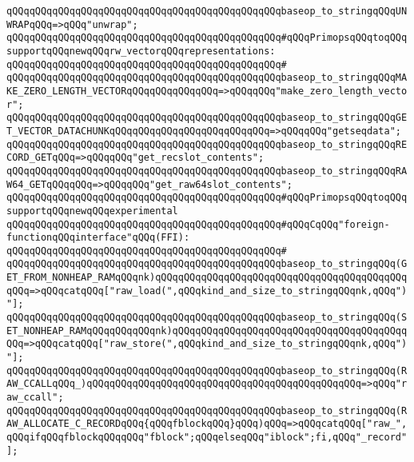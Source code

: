 \verb|qQQqqQQqqQQqqQQqqQQqqQQqqQQqqQQqqQQqqQQqqQQqqQQqbaseop_to_stringqQQqUNWRAPqQQq=>qQQq"unwrap";|\newline
\newline
\verb|qQQqqQQqqQQqqQQqqQQqqQQqqQQqqQQqqQQqqQQqqQQqqQQq#qQQqPrimopsqQQqtoqQQqsupportqQQqnewqQQqrw_vectorqQQqrepresentations:|\newline
\verb|qQQqqQQqqQQqqQQqqQQqqQQqqQQqqQQqqQQqqQQqqQQqqQQq#|\newline
\verb|qQQqqQQqqQQqqQQqqQQqqQQqqQQqqQQqqQQqqQQqqQQqqQQqbaseop_to_stringqQQqMAKE_ZERO_LENGTH_VECTORqQQqqQQqqQQqqQQq=>qQQqqQQq"make_zero_length_vector";|\newline
\verb|qQQqqQQqqQQqqQQqqQQqqQQqqQQqqQQqqQQqqQQqqQQqqQQqbaseop_to_stringqQQqGET_VECTOR_DATACHUNKqQQqqQQqqQQqqQQqqQQqqQQqqQQq=>qQQqqQQq"getseqdata";|\newline
\verb|qQQqqQQqqQQqqQQqqQQqqQQqqQQqqQQqqQQqqQQqqQQqqQQqbaseop_to_stringqQQqRECORD_GETqQQq=>qQQqqQQq"get_recslot_contents";|\newline
\verb|qQQqqQQqqQQqqQQqqQQqqQQqqQQqqQQqqQQqqQQqqQQqqQQqbaseop_to_stringqQQqRAW64_GETqQQqqQQq=>qQQqqQQq"get_raw64slot_contents";|\newline
\newline
\verb|qQQqqQQqqQQqqQQqqQQqqQQqqQQqqQQqqQQqqQQqqQQqqQQq#qQQqPrimopsqQQqtoqQQqsupportqQQqnewqQQqexperimental|\newline
\verb|qQQqqQQqqQQqqQQqqQQqqQQqqQQqqQQqqQQqqQQqqQQqqQQq#qQQqCqQQq"foreign-functionqQQqinterface"qQQq(FFI):|\newline
\verb|qQQqqQQqqQQqqQQqqQQqqQQqqQQqqQQqqQQqqQQqqQQqqQQq#|\newline
\verb|qQQqqQQqqQQqqQQqqQQqqQQqqQQqqQQqqQQqqQQqqQQqqQQqbaseop_to_stringqQQq(GET_FROM_NONHEAP_RAMqQQqnk)qQQqqQQqqQQqqQQqqQQqqQQqqQQqqQQqqQQqqQQqqQQqqQQq=>qQQqcatqQQq["raw_load(",qQQqkind_and_size_to_stringqQQqnk,qQQq")"];|\newline
\verb|qQQqqQQqqQQqqQQqqQQqqQQqqQQqqQQqqQQqqQQqqQQqqQQqbaseop_to_stringqQQq(SET_NONHEAP_RAMqQQqqQQqqQQqnk)qQQqqQQqqQQqqQQqqQQqqQQqqQQqqQQqqQQqqQQqqQQq=>qQQqcatqQQq["raw_store(",qQQqkind_and_size_to_stringqQQqnk,qQQq")"];|\newline
\verb|qQQqqQQqqQQqqQQqqQQqqQQqqQQqqQQqqQQqqQQqqQQqqQQqbaseop_to_stringqQQq(RAW_CCALLqQQq_)qQQqqQQqqQQqqQQqqQQqqQQqqQQqqQQqqQQqqQQqqQQqqQQq=>qQQq"raw_ccall";|\newline
\verb|qQQqqQQqqQQqqQQqqQQqqQQqqQQqqQQqqQQqqQQqqQQqqQQqbaseop_to_stringqQQq(RAW_ALLOCATE_C_RECORDqQQq{qQQqfblockqQQq}qQQq)qQQq=>qQQqcatqQQq["raw_",qQQqifqQQqfblockqQQqqQQq"fblock";qQQqelseqQQq"iblock";fi,qQQq"_record"];|\newline
